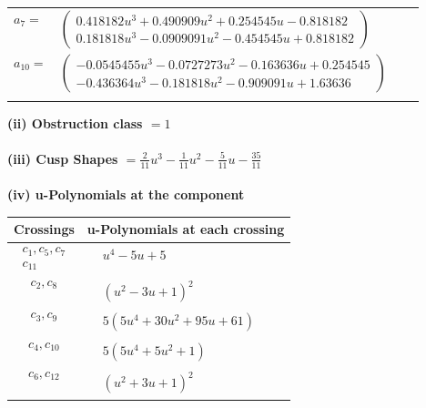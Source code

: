 \documentclass[1p]{elsarticle_modified}
\theoremstyle{definition}
\begin{document}
\begin{tabular}{m{7pt} m{180pt} m{7pt} m{180pt} }
\flushright $a_{7}=$&$\begin{pmatrix}0.418182 u^{3}+0.490909 u^{2}+0.254545 u-0.818182\\0.181818 u^{3}-0.0909091 u^{2}-0.454545 u+0.818182\end{pmatrix}$ \\
\flushright $a_{10}=$&$\begin{pmatrix}-0.0545455 u^{3}-0.0727273 u^{2}-0.163636 u+0.254545\\-0.436364 u^{3}-0.181818 u^{2}-0.909091 u+1.63636\end{pmatrix}$\\&\end{tabular}
\flushleft \textbf{(ii) Obstruction class $= 1$}\\~\\
\flushleft \textbf{(iii) Cusp Shapes $= \frac{2}{11} u^3-\frac{1}{11} u^2-\frac{5}{11} u-\frac{35}{11}$}\\~\\
\newpage\renewcommand{\arraystretch}{1}
\flushleft \textbf{(iv) u-Polynomials at the component}\newline \\
\begin{tabular}{m{50pt}|m{274pt}}
Crossings & \hspace{64pt}u-Polynomials at each crossing \\
\hline $$\begin{aligned}c_{1},c_{5},c_{7}\\c_{11}\end{aligned}$$&$\begin{aligned}
&u^4-5 u+5
\end{aligned}$\\
\hline $$\begin{aligned}c_{2},c_{8}\end{aligned}$$&$\begin{aligned}
&(u^2-3 u+1)^2
\end{aligned}$\\
\hline $$\begin{aligned}c_{3},c_{9}\end{aligned}$$&$\begin{aligned}
&5(5 u^4+30 u^2+95 u+61)
\end{aligned}$\\
\hline $$\begin{aligned}c_{4},c_{10}\end{aligned}$$&$\begin{aligned}
&5(5 u^4+5 u^2+1)
\end{aligned}$\\
\hline $$\begin{aligned}c_{6},c_{12}\end{aligned}$$&$\begin{aligned}
&(u^2+3 u+1)^2
\end{aligned}$\\
\hline
\end{tabular}\\~\\
\end{document}
